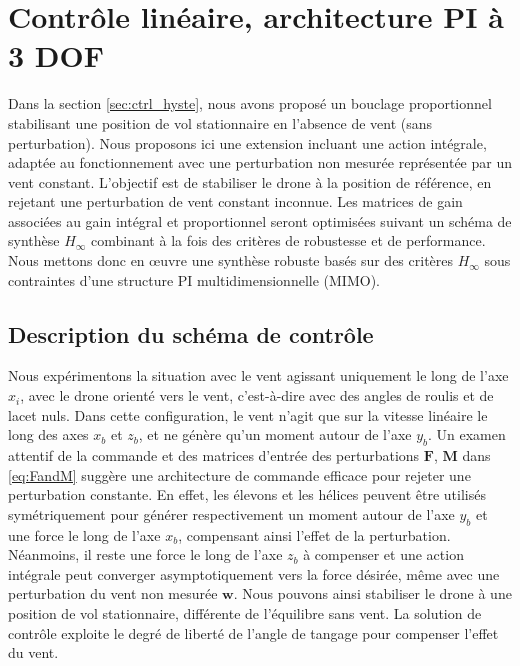 \section{Contrôle linéaire, architecture PI à 3 DOF}
\label{sec:3dofcmd}
Dans la section \ref{sec:ctrl_hyste}, nous avons proposé un bouclage proportionnel stabilisant une position de vol stationnaire en l'absence de vent (sans perturbation). Nous proposons ici une extension incluant une action intégrale, adaptée au fonctionnement avec une perturbation non mesurée représentée par un vent constant. L'objectif est de stabiliser le drone à la position de référence, en rejetant une perturbation de vent constant inconnue.
Les matrices de gain associées au gain intégral et proportionnel seront optimisées suivant un schéma de synthèse $H_{\infty}$ combinant à la fois des critères de robustesse et de performance. Nous mettons donc en œuvre une synthèse robuste basés sur des critères $H_{\infty}$ sous contraintes d'une structure PI multidimensionnelle (MIMO).

\subsection{Description du schéma de contrôle}
Nous expérimentons la situation avec le vent agissant uniquement le long de l'axe $x_{i}$, avec le drone orienté vers le vent, c'est-à-dire avec des angles de roulis et de lacet nuls. Dans cette configuration, le vent n'agit que sur la vitesse linéaire le long des axes $x_{b}$ et $z_{b}$, et ne génère qu'un moment autour de l'axe $y_{b}$. Un examen attentif de la commande et des matrices d'entrée des perturbations $\boldsymbol{F}$, $\boldsymbol{M}$ dans \eqref{eq:FandM} suggère une architecture de commande efficace pour rejeter une perturbation constante. En effet, les élevons et les hélices peuvent être utilisés symétriquement pour générer respectivement un moment autour de l'axe $y_{b}$ et une force le long de l'axe $x_{b}$, compensant ainsi l'effet de la perturbation. Néanmoins, il reste une force le long de l'axe $z_{b}$ à compenser et une action intégrale peut converger asymptotiquement vers la force désirée, même avec une perturbation du vent non mesurée $\boldsymbol{w}$. Nous pouvons ainsi stabiliser le drone à une position de vol stationnaire, différente de l'équilibre sans vent. La solution de contrôle exploite le degré de liberté de l'angle de tangage pour compenser l'effet du vent.

